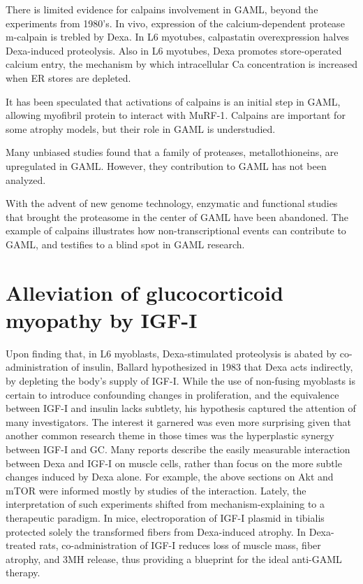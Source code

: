 \documentclass[12pt,english]{report}\usepackage[]{graphicx}\usepackage[]{color}
\begin{document}
There is limited evidence for calpains involvement in GAML, beyond
the experiments from 1980's. In vivo, expression of the calcium-dependent
protease m-calpain is trebled by Dexa\citep{dardevet1995sensitivity}.
In L6 myotubes, calpastatin overexpression halves Dexa-induced proteolysis\citep{fareed2006treatment}.
Also in L6 myotubes, Dexa promotes store-operated calcium entry, the
mechanism by which intracellular Ca concentration is increased when
ER stores are depleted\citep{itagaki2010dexamethasone}.

It has been speculated that activations of calpains is an initial
step in GAML, allowing myofibril protein to interact with MuRF-1\citep{goll2003calpain}.
Calpains are important for some atrophy models, but their role in
GAML is understudied.

Many unbiased studies found that a family of proteases, metallothioneins,
are upregulated in GAML\citep{lecker2004multiple}. However, they
contribution to GAML has not been analyzed.

With the advent of new genome technology, enzymatic and functional
studies that brought the proteasome in the center of GAML have been
abandoned. The example of calpains illustrates how non-transcriptional
events can contribute to GAML, and testifies to a blind spot in GAML
research.


\section{Alleviation of glucocorticoid myopathy by IGF-I}

Upon finding that, in L6 myoblasts, Dexa-stimulated proteolysis is
abated by co-administration of insulin, Ballard hypothesized in 1983
that Dexa acts indirectly, by depleting the body's supply of IGF-I\citep{ballard1983effects}.
While the use of non-fusing myoblasts is certain to introduce confounding
changes in proliferation, and the equivalence between IGF-I and insulin
lacks subtlety, his hypothesis captured the attention of many investigators.
The interest it garnered was even more surprising given that another
common research theme in those times was the hyperplastic synergy
between IGF-I and GC\citep{ewton1981effects,elsner1998regulation}.
Many reports describe the easily measurable interaction between Dexa
and IGF-I on muscle cells, rather than focus on the more subtle changes
induced by Dexa alone. For example, the above sections on Akt and
mTOR were informed mostly by studies of the interaction. Lately, the
interpretation of such experiments shifted from mechanism-explaining
to a therapeutic paradigm. In mice, electroporation of IGF-I plasmid
in tibialis protected solely the transformed fibers from Dexa-induced
atrophy\citep{schakman2005insulin-like}. In Dexa-treated rats, co-administration
of IGF-I reduces loss of muscle mass, fiber atrophy, and 3MH release\citep{kanda1999preventive},
thus providing a blueprint for the ideal anti-GAML therapy.
\end{document}
